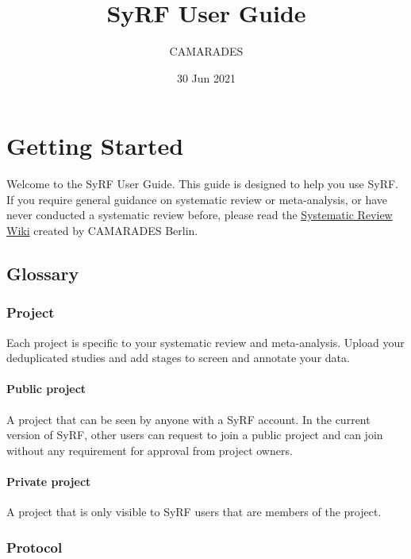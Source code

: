 \documentclass[
]{book}
\title{SyRF User Guide}
\author{CAMARADES}
\date{30 Jun 2021}
\begin{document}
\maketitle

{
\setcounter{tocdepth}{1}
\tableofcontents
}
\hypertarget{index}{%
\chapter{Getting Started}\label{index}}

Welcome to the SyRF User Guide. This guide is designed to help you use SyRF. If you require general guidance on systematic review or meta-analysis, or have never conducted a systematic review before, please read the \href{https://www.camarades.de/}{Systematic Review Wiki} created by CAMARADES Berlin.

\hypertarget{glossary}{%
\section{Glossary}\label{glossary}}

\hypertarget{project}{%
\subsection{Project}\label{project}}

Each project is specific to your systematic review and meta-analysis. Upload your deduplicated studies and add stages to screen and annotate your data.

\hypertarget{public-project}{%
\subsubsection{Public project}\label{public-project}}

A project that can be seen by anyone with a SyRF account. In the current version of SyRF, other users can request to join a public project and can join without any requirement for approval from project owners.

\hypertarget{private-project}{%
\subsubsection{Private project}\label{private-project}}

A project that is only visible to SyRF users that are members of the project.

\hypertarget{protocol}{%
\subsection{Protocol}\label{protocol}}
\end{document}
